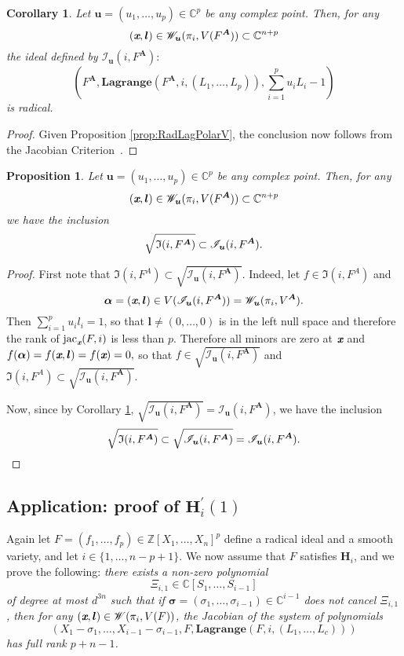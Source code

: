 \documentclass[a4paper]{article}
\def\sW{\mathscr{W}}
\def\sI{\mathscr{I}}
\def\mA{{\bm A}}
\def\ub{{\bm u}}
\def\lb{{\bm l}}
\def\xb{\textit{\textbf{x}}}
\DeclareMathOperator{\jac}{jac}
\newcommand{\ZZ}{{\mathbb{Z}}}
\def\C{\mathbb{C}}
\def\IiA{\mathfrak{I}(i,F^A)}
\def\lagF{{\bm{Lagrange}}(F,i,(L_1,\hdots,L_c))}
\def\lagFA{{\bm{Lagrange}}(F^{\mA},i,(L_1,\hdots,L_p))}
\def\IilA{\mathscr{I}_{\ub}(i,F^{\mA})}
\def\WilA{\mathscr{W}_{\ub}(\pi_i,V^{\mA})}
\newtheorem{corollary}[theorem]{Corollary}
\newtheorem{prop}[theorem]{Proposition}
\begin{document}
    \begin{corollary}\label{cor:LagIdealRadical}
Let $\ub = (u_1,\hdots,u_p) \in \C^p$ be any complex point. Then, for any \[(\xb,\lb)\in \mathscr{W}_{\ub}(\pi_i,V(F^{\mA})) \subset \C^{n+p}\] the ideal defined by $\sI_{\ub}(i,F^{\mA}) :$\[ \left(F^{\mA},\lagFA,\sum_{i=1}^p u_iL_i-1\right)\] is radical.
    \end{corollary}
    \begin{proof}
    Given Proposition \ref{prop:RadLagPolarV}, the conclusion now follows from the Jacobian Criterion~\cite[Corollary 16.20]{ECA}.
    \end{proof}
    \begin{prop}\label{prop:polarVs2}
Let $\ub = (u_1,\hdots,u_p) \in \C^p$ be any complex point. Then, for any \[(\xb,\lb)\in \mathscr{W}_{\ub}(\pi_i,V(F^{\mA})) \subset \C^{n+p}\]we have the inclusion
    \[
    \sqrt{\frak{I}(i,F^{\mA})} \subset \IilA.
    \]
    \end{prop}
    \begin{proof}
    First note that $\IiA \subset \sqrt{\IilA}.$ Indeed, let $f \in \IiA$ and \[\bm \alpha = (\xb,\lb) \in V(\IilA)=\WilA.\] Then $\sum_{i=1}^p u_i l_i = 1$, so that $\lb \not = (0,\hdots,0)$ is in the left null space and therefore the rank of $\jac_{\xb} (F,i)$ is less than $p.$ Therefore all minors are zero at $\xb$ and $f(\bm \alpha)= f(\xb,\lb)=f(\xb)=0,$ so that $f \in \sqrt{\IilA}$ and $\IiA \subset \sqrt{\IilA}.$
    \par 
    Now, since by Corollary \ref{cor:LagIdealRadical}, $\sqrt{\IilA} = \IilA$, we have the inclusion
    \[
    \sqrt{\frak{I}(i,F^{\mA})} \subset \sqrt{\IilA} = \IilA.
    \]
    \end{proof}


\subsection{Application: proof of $\textbf{H}_i^{'}(1)$}\label{proof:hip}
Again let $F = (f_1,\hdots,f_p) \in \ZZ[X_1,\hdots,X_n]^p$  define a radical ideal and a smooth variety, and let $i\in \{1,\hdots,n-p+1\}$. We now assume
that $F$ satisfies $\textbf{H}_i$, and we prove the following: {\em
  there exists a non-zero polynomial 
  \[
  \Xi_{i,1} \in
  \C[S_1,\dots,S_{i-1}]
  \]
  of degree at most $d^{3n}$ such that if $
  \bm \sigma = (\sigma_1,\hdots,\sigma_{i-1}) \in \C^{i-1}$ does not cancel
  $\Xi_{i,1}$, then for any $(\xb,\lb) \in \sW(\pi_i,V(F))$, the Jacobian of the system of polynomials
  $$\left(X_1-\sigma_1,\dots,X_{i-1}-\sigma_{i-1},F,\lagF\right)$$ has full rank $p+n-1$.}
\end{document}
